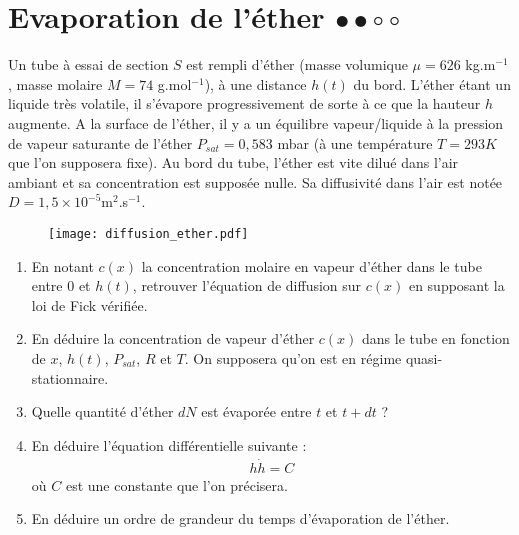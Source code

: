 \newpage

\section{Evaporation de l'éther $\bullet\bullet\circ\circ$}

Un tube à essai de section $S$ est rempli d'éther (masse volumique $\mu=626$ kg.m$^{-1}$, masse molaire $M=74$ g.mol$^{-1}$), à une distance $h(t)$ du bord. L'éther étant un liquide très volatile, il s'évapore progressivement de sorte à ce que la hauteur $h$ augmente. A la surface de l'éther, il y a un équilibre vapeur/liquide à la pression de vapeur saturante de l'éther $P_{sat}=0,583$ mbar (à une température $T=293K$ que l'on supposera fixe). Au bord du tube, l'éther est vite dilué dans l'air ambiant et sa concentration est supposée nulle. Sa diffusivité dans l'air est notée $D=1,5\times10^{-5}$m$^2$.s$^{-1}$.

\begin{figure}[h!]
\centering
  \texttt{[image: diffusion\_ether.pdf]}
\end{figure}

\begin{enumerate}

	\item En notant $c(x)$ la concentration molaire en vapeur d'éther dans le tube entre $0$ et $h(t)$, retrouver l'équation de diffusion sur $c(x)$ en supposant la loi de Fick vérifiée.
	
	\item En déduire la concentration de vapeur d'éther $c(x)$ dans le tube en fonction de $x$, $h(t)$, $P_{sat}$, $R$ et $T$. On supposera qu'on est en régime quasi-stationnaire.
	
	\item Quelle quantité d'éther $dN$ est évaporée entre $t$ et $t+dt$ ? 
	
	\item En déduire l'équation différentielle suivante :
	\begin{align*}
		h\dot{h}=C		
	\end{align*}
	où $C$ est une constante que l'on précisera.
	
	\item En déduire un ordre de grandeur du temps d'évaporation de l'éther.

\end{enumerate}

\newpage

